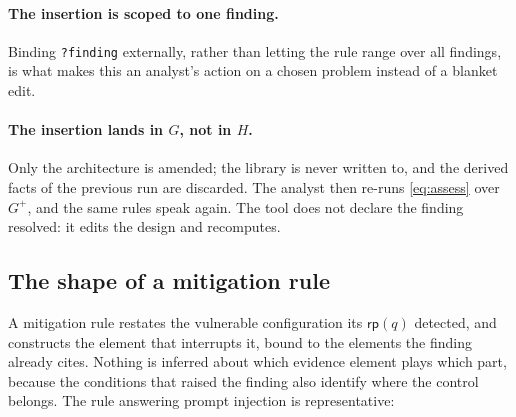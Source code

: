 \documentclass[11pt,a4paper]{article}
\theoremstyle{definition}
\theoremstyle{plain}
\newcommand{\Arch}{G}
\begin{document}
\paragraph{The insertion is scoped to one finding.} Binding \texttt{?finding}
externally, rather than letting the rule range over all findings, is what makes
this an analyst's action on a chosen problem instead of a blanket edit.

\paragraph{The insertion lands in $\Arch$, not in $H$.} Only the architecture is
amended; the library is never written to, and the derived facts of the previous
run are discarded. The analyst then re-runs \eqref{eq:assess} over $\Arch^{+}$,
and the same rules speak again. The tool does not declare the finding resolved:
it edits the design and recomputes.

\subsection{The shape of a mitigation rule}

A mitigation rule restates the vulnerable configuration its
$\mathsf{rp}(q)$ detected, and constructs the element that interrupts it, bound
to the elements the finding already cites. Nothing is inferred about which
evidence element plays which part, because the conditions that raised the
finding also identify where the control belongs. The rule answering prompt
injection is representative:
\end{document}
